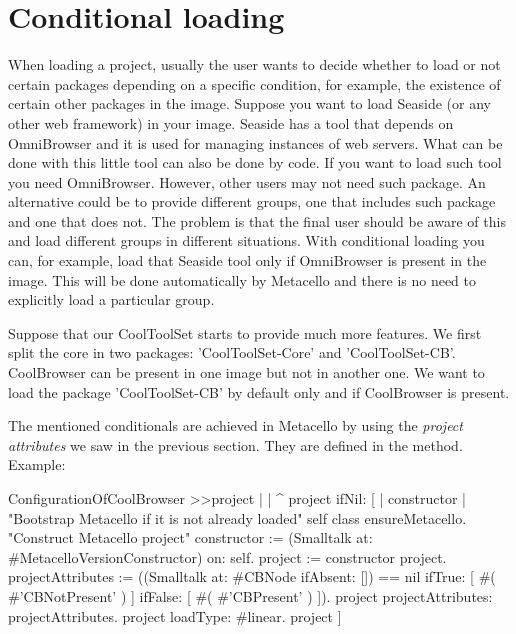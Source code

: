 \documentclass[a4paper,10pt,twoside]{book}
\begin{document}
\section{Conditional loading}
When loading a project, usually the user wants to decide whether to load or not certain packages depending on a specific condition, for example, the existence of certain other packages in the image. Suppose you want to load Seaside (or any other web framework) in your image. Seaside has a tool that depends on OmniBrowser and it is used for managing instances of web servers. What can be done with this little tool can also be done by code. If you want to load such tool you need OmniBrowser. However, other users may not need such package. An alternative could be to provide different groups, one that includes such package and one that does not. The problem is that the final user should be aware of this and load different groups in different situations.  With conditional loading you can, for example, load that Seaside tool only if OmniBrowser is present in the image. This will be done automatically by Metacello and there is no need to explicitly load a particular group. 

Suppose that our CoolToolSet starts to provide much more features. We first split the core in two packages: 'CoolToolSet-Core' and 'CoolToolSet-CB'. CoolBrowser can be present in one image but not in another one. We want to load the package 'CoolToolSet-CB' by default only and if CoolBrowser is present. 

The mentioned conditionals are achieved in Metacello by using the \emph{project attributes} we saw in the previous section. They are defined in the  method. 
Example:


\begin{code}{}
ConfigurationOfCoolBrowser >>project
       |  | 
       ^ project ifNil: [ | constructor |
              "Bootstrap Metacello if it is not already loaded"
              self class ensureMetacello.
              "Construct Metacello project"
              constructor := (Smalltalk at: #MetacelloVersionConstructor) on: self.
              project := constructor project.
              projectAttributes :=  ((Smalltalk at: #CBNode ifAbsent: []) == nil
                     ifTrue: [ #( #'CBNotPresent' ) ]
                     ifFalse: [ #( #'CBPresent' ) ]).
              project projectAttributes:  projectAttributes.
              project loadType: #linear.
              project ]

\end{code}
\end{document}
